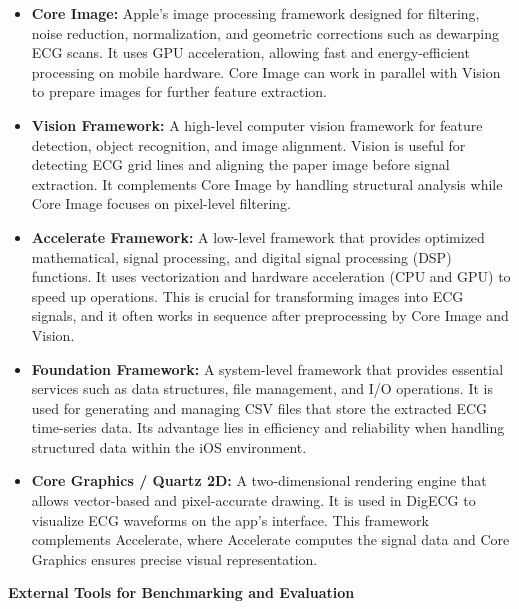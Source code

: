 \begin{itemize}
    \item \textbf{Core Image:} Apple’s image processing framework designed for filtering, noise reduction, normalization, and geometric corrections such as dewarping ECG scans. It uses GPU acceleration, allowing fast and energy-efficient processing on mobile hardware. Core Image can work in parallel with Vision to prepare images for further feature extraction.  
    \item \textbf{Vision Framework:} A high-level computer vision framework for feature detection, object recognition, and image alignment. Vision is useful for detecting ECG grid lines and aligning the paper image before signal extraction. It complements Core Image by handling structural analysis while Core Image focuses on pixel-level filtering.  
    \item \textbf{Accelerate Framework:} A low-level framework that provides optimized mathematical, signal processing, and digital signal processing (DSP) functions. It uses vectorization and hardware acceleration (CPU and GPU) to speed up operations. This is crucial for transforming images into ECG signals, and it often works in sequence after preprocessing by Core Image and Vision.  
    \item \textbf{Foundation Framework:} A system-level framework that provides essential services such as data structures, file management, and I/O operations. It is used for generating and managing CSV files that store the extracted ECG time-series data. Its advantage lies in efficiency and reliability when handling structured data within the iOS environment.  
    \item \textbf{Core Graphics / Quartz 2D:} A two-dimensional rendering engine that allows vector-based and pixel-accurate drawing. It is used in DigECG to visualize ECG waveforms on the app’s interface. This framework complements Accelerate, where Accelerate computes the signal data and Core Graphics ensures precise visual representation.  
\end{itemize}

\textbf{External Tools for Benchmarking and Evaluation}

